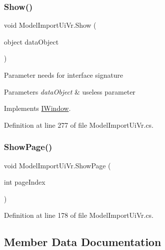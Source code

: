 \subsubsection{\texorpdfstring{Show()}{Show()}}
{\footnotesize\ttfamily void Model\+Import\+Ui\+Vr.\+Show (\begin{DoxyParamCaption}\item[{object}]{data\+Object }\end{DoxyParamCaption})}



Parameter needs for interface signature 


\begin{DoxyParams}{Parameters}
{\em data\+Object} & useless parameter\\
\hline
\end{DoxyParams}


Implements \mbox{\hyperlink{interface_i_window_aba12a3c53948d87aef07aed93b225aa9}{I\+Window}}.



Definition at line 277 of file Model\+Import\+Ui\+Vr.\+cs.

\mbox{\label{class_model_import_ui_vr_a0f0039545cfe15bbea8f647c6173a9a2}} 
\subsubsection{\texorpdfstring{ShowPage()}{ShowPage()}}
{\footnotesize\ttfamily void Model\+Import\+Ui\+Vr.\+Show\+Page (\begin{DoxyParamCaption}\item[{int}]{page\+Index }\end{DoxyParamCaption})}



Definition at line 178 of file Model\+Import\+Ui\+Vr.\+cs.



\subsection{Member Data Documentation}
\mbox{\label{class_model_import_ui_vr_a43fbbfac9bf58148f3e2a05827824079}} 

